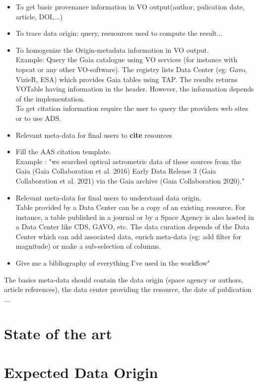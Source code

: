 \documentclass[11pt,a4paper]{ivoa}
\begin{document}
\begin{itemize}
	\item To get basic provenance information in VO output(author, pulication date, article, DOI,...) 
        \item To trace data origin: query, resuources used to compute the result... 
        \item To homogenize the Origin-metadata information in VO output.\\
	Example: Query the Gaia catalogue using VO services (for instance with topcat or any other VO-software). The registry lists Data Center (eg: Gavo, VizieR, ESA) which provides Gaia  tables using TAP. The results returns VOTable having information in the header. However, the information depends of the implementation.\\
	To get citation information require the user to query the providers web sites or to use ADS.
	\item Relevant meta-data for final users to \textbf{cite} resources 
        \item Fill the AAS citation template.\\
         Example : "we searched optical astrometric data of these sources from the Gaia (Gaia Collaboration et al. 2016) Early Data Release 3 (Gaia Collaboration et al. 2021) via the Gaia archive (Gaia Collaboration 2020)."
	\item Relevant meta-data for final users to understand data origin.\\
	Table provided by a Data Center can be a copy of an existing resource. For instance, a table published in a journal or by a Space Agency is also hosted in a Data Center like CDS, GAVO, etc.
	The data curation depends of the Data Center which can add associated data, enrich meta-data (eg: add filter for magnitude) or make a sub-selection of columns.
	\item Give me a bibliography of everything I've used in the workflow"
\end{itemize}

The basics meta-data should contain the data origin (space agency or authors, article references), the data center providing the resource, the date of publication ...

\section{State of the art}

\section{Expected Data Origin}
\end{document}
